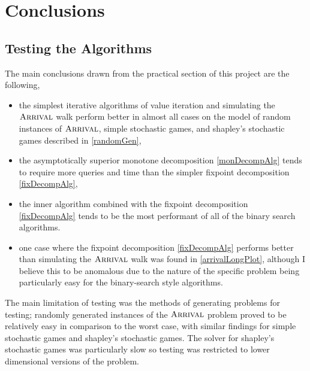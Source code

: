 \chapter{Conclusions}
\section{Testing the Algorithms}
The main conclusions drawn from the practical section of this project
are the following,
\begin{itemize}
  \item the simplest iterative algorithms of value iteration and simulating the $\textsc{Arrival}$ walk
    perform better in almost all cases on the model of random instances of $\textsc{Arrival}$, simple stochastic games,
    and shapley's stochastic games described in \cref{randomGen},
  \item the asymptotically superior monotone decomposition \cref{monDecompAlg} tends
    to require more queries and time than the simpler fixpoint decomposition \cref{fixDecompAlg},
  \item the inner algorithm combined with the fixpoint decomposition \cref{fixDecompAlg} tends to be the most performant
    of all of the binary search algorithms.
  \item one case where the fixpoint decomposition \ref{fixDecompAlg} performs better than
    simulating the $\textsc{Arrival}$ walk was found in \cref{arrivalLongPlot}, although I believe
    this to be anomalous due to the nature of the specific problem being particularly
    easy for the binary-search style algorithms.
\end{itemize}
The main limitation of testing was the methods of generating problems for testing;
randomly generated instances of the $\textsc{Arrival}$ problem proved to be relatively easy
in comparison to the worst case, with similar findings for simple stochastic games
and shapley's stochastic games. The solver for shapley's stochastic games was
particularly slow so testing was restricted to lower dimensional versions of the problem.

